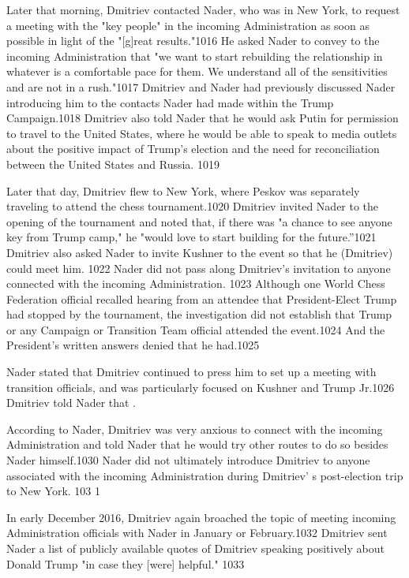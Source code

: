 Later that morning, Dmitriev contacted Nader, who was in New York, to request a meeting with the "key people"  in the incoming Administration as soon as possible in light of the "[g]reat results."1016 He asked Nader to convey to the incoming Administration that "we want to start rebuilding the relationship in whatever is a comfortable pace for them. We understand all of the sensitivities and are not in a  rush."1017 Dmitriev and Nader had previously discussed Nader introducing him to the contacts Nader had made within the Trump Campaign.1018 Dmitriev also told Nader that he would ask Putin for permission to travel to the United States, where he would be able to speak to media outlets about the positive impact of Trump's election and the need for reconciliation between the United States and Russia. 1019

Later that day, Dmitriev flew to New York, where Peskov was separately traveling to attend the chess tournament.1020 Dmitriev  invited Nader to the opening of the tournament and noted that, if there was "a chance to see anyone key from Trump camp," he "would love to start building for the future.''1021 Dmitriev also asked Nader to invite Kushner to the event so that he (Dmitriev) could meet him. 1022 Nader did not pass along Dmitriev's invitation to anyone connected with the incoming Administration. 1023 Although one World Chess Federation official recalled hearing from an attendee that President-Elect Trump had stopped by the tournament, the investigation did not establish that Trump or any Campaign or Transition Team official attended the event.1024 And the President's written answers denied that he had.1025

Nader stated that Dmitriev continued to press him to set up a  meeting with transition officials, and was particularly focused on Kushner and Trump Jr.1026 Dmitriev told Nader that .

According to Nader, Dmitriev was very anxious to connect with the incoming Administration and told Nader that he would try other routes to do so besides Nader himself.1030 Nader did not ultimately introduce Dmitriev to anyone associated with the incoming Administration during Dmitriev' s post-election trip to New York. 103 1

In early December 2016, Dmitriev again broached the topic of meeting incoming Administration officials with Nader in January  or February.1032 Dmitriev sent Nader a  list of publicly available quotes of Dmitriev speaking positively about Donald Trump "in case they [were] helpful." 1033

